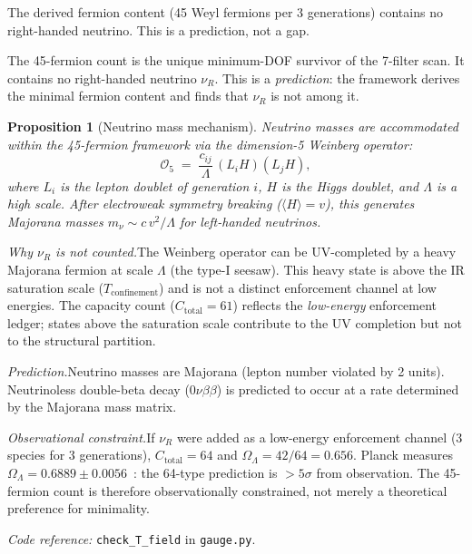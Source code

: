 \documentclass[11pt,a4paper]{article}
\newtheorem{proposition}[theorem]{Proposition}
\theoremstyle{definition}
\newcommand{\coderef}[2]{\smallskip\noindent\textit{Code reference:} \texttt{#1} in \texttt{#2}.}
\begin{document}
The derived fermion content (45 Weyl fermions per 3 generations) contains
no right-handed neutrino.  This is a prediction, not a gap.


The 45-fermion count is the unique minimum-DOF survivor of the 7-filter
scan.  It contains no right-handed neutrino $\nu_R$.  This is a
\emph{prediction}: the framework derives the minimal fermion content
and finds that $\nu_R$ is not among it.

\begin{proposition}[Neutrino mass mechanism]\label{prop:neutrino_mass}
Neutrino masses are accommodated within the 45-fermion framework via
the dimension-5 Weinberg operator:
\[
  \mathcal{O}_5 \;=\; \frac{c_{ij}}{\Lambda}\,(L_i H)(L_j H),
\]
where $L_i$ is the lepton doublet of generation $i$, $H$ is the Higgs
doublet, and $\Lambda$ is a high scale.  After electroweak symmetry
breaking ($\langle H \rangle = v$), this generates Majorana masses
$m_\nu \sim c\, v^2 / \Lambda$ for left-handed neutrinos.
\end{proposition}

\noindent\textit{Why $\nu_R$ is not counted.}\quad The Weinberg operator
can be UV-completed by a heavy Majorana fermion at scale $\Lambda$
(the type-I seesaw).  This heavy state is above the IR saturation scale
($T_{\mathrm{confinement}}$) and is not a distinct enforcement channel
at low energies.  The capacity count ($C_{\mathrm{total}} = 61$)
reflects the \emph{low-energy} enforcement ledger; states above the
saturation scale contribute to the UV completion but not to the
structural partition.

\smallskip\noindent\textit{Prediction.}\quad Neutrino masses are
Majorana (lepton number violated by 2 units).  Neutrinoless double-beta
decay ($0\nu\beta\beta$) is predicted to occur at a rate determined by
the Majorana mass matrix.

\smallskip\noindent\textit{Observational constraint.}\quad If $\nu_R$
were added as a low-energy enforcement channel (3 species for 3
generations), $C_{\mathrm{total}} = 64$ and
$\Omega_\Lambda = 42/64 = 0.656$.  Planck measures
$\Omega_\Lambda = 0.6889 \pm 0.0056$~\cite{Planck2020}: the 64-type
prediction is $>5\sigma$ from observation.  The 45-fermion count is
therefore observationally constrained, not merely a theoretical
preference for minimality.

\coderef{check\_T\_field}{gauge.py}


\newpage
\end{document}
